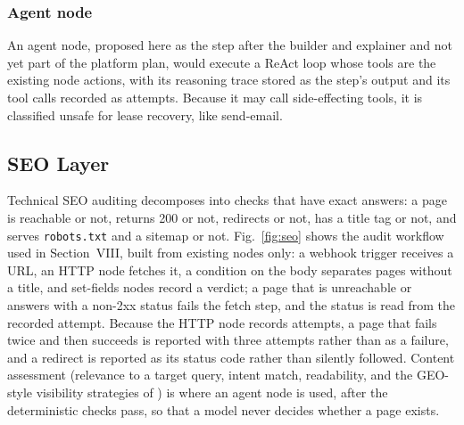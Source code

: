 \documentclass[conference]{IEEEtran}
\begin{document}
\subsubsection{Agent node}
An agent node, proposed here as the step after the builder and explainer and not yet part of the platform plan, would execute a ReAct loop whose tools are the existing node actions, with its reasoning trace stored as the step's output and its tool calls recorded as attempts. Because it may call side-effecting tools, it is classified unsafe for lease recovery, like send-email.

\subsection{SEO Layer}
Technical SEO auditing decomposes into checks that have exact answers: a page is reachable or not, returns 200 or not, redirects or not, has a title tag or not, and serves \texttt{robots.txt} and a sitemap or not. Fig.~\ref{fig:seo} shows the audit workflow used in Section~VIII, built from existing nodes only: a webhook trigger receives a URL, an HTTP node fetches it, a condition on the body separates pages without a title, and set-fields nodes record a verdict; a page that is unreachable or answers with a non-2xx status fails the fetch step, and the status is read from the recorded attempt. Because the HTTP node records attempts, a page that fails twice and then succeeds is reported with three attempts rather than as a failure, and a redirect is reported as its status code rather than silently followed. Content assessment (relevance to a target query, intent match, readability, and the GEO-style visibility strategies of \cite{aggarwal2024geo}) is where an agent node is used, after the deterministic checks pass, so that a model never decides whether a page exists.
\end{document}
